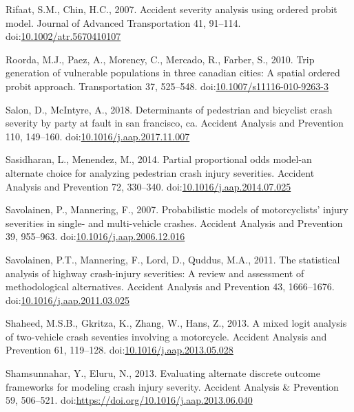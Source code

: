 \documentclass[]{elsarticle} %
\begin{document}
\leavevmode\hypertarget{ref-Rifaat2007accident}{}%
Rifaat, S.M., Chin, H.C., 2007. Accident severity analysis using ordered
probit model. Journal of Advanced Transportation 41, 91--114.
doi:\href{https://doi.org/10.1002/atr.5670410107}{10.1002/atr.5670410107}

\leavevmode\hypertarget{ref-Roorda2010trip}{}%
Roorda, M.J., Paez, A., Morency, C., Mercado, R., Farber, S., 2010. Trip
generation of vulnerable populations in three canadian cities: A spatial
ordered probit approach. Transportation 37, 525--548.
doi:\href{https://doi.org/10.1007/s11116-010-9263-3}{10.1007/s11116-010-9263-3}

\leavevmode\hypertarget{ref-Salon2018determinants}{}%
Salon, D., McIntyre, A., 2018. Determinants of pedestrian and bicyclist
crash severity by party at fault in san francisco, ca. Accident Analysis
and Prevention 110, 149--160.
doi:\href{https://doi.org/10.1016/j.aap.2017.11.007}{10.1016/j.aap.2017.11.007}

\leavevmode\hypertarget{ref-Sasidharan2014partial}{}%
Sasidharan, L., Menendez, M., 2014. Partial proportional odds model-an
alternate choice for analyzing pedestrian crash injury severities.
Accident Analysis and Prevention 72, 330--340.
doi:\href{https://doi.org/10.1016/j.aap.2014.07.025}{10.1016/j.aap.2014.07.025}

\leavevmode\hypertarget{ref-Savolainen2007probabilistic}{}%
Savolainen, P., Mannering, F., 2007. Probabilistic models of
motorcyclists' injury severities in single- and multi-vehicle crashes.
Accident Analysis and Prevention 39, 955--963.
doi:\href{https://doi.org/10.1016/j.aap.2006.12.016}{10.1016/j.aap.2006.12.016}

\leavevmode\hypertarget{ref-Savolainen2011statistical}{}%
Savolainen, P.T., Mannering, F., Lord, D., Quddus, M.A., 2011. The
statistical analysis of highway crash-injury severities: A review and
assessment of methodological alternatives. Accident Analysis and
Prevention 43, 1666--1676.
doi:\href{https://doi.org/10.1016/j.aap.2011.03.025}{10.1016/j.aap.2011.03.025}

\leavevmode\hypertarget{ref-Shaheed2013mixed}{}%
Shaheed, M.S.B., Gkritza, K., Zhang, W., Hans, Z., 2013. A mixed logit
analysis of two-vehicle crash seventies involving a motorcycle. Accident
Analysis and Prevention 61, 119--128.
doi:\href{https://doi.org/10.1016/j.aap.2013.05.028}{10.1016/j.aap.2013.05.028}

\leavevmode\hypertarget{ref-Shamsunnahar2013evaluating}{}%
Shamsunnahar, Y., Eluru, N., 2013. Evaluating alternate discrete outcome
frameworks for modeling crash injury severity. Accident Analysis \&
Prevention 59, 506--521.
doi:\href{https://doi.org/https://doi.org/10.1016/j.aap.2013.06.040}{https://doi.org/10.1016/j.aap.2013.06.040}
\end{document}
